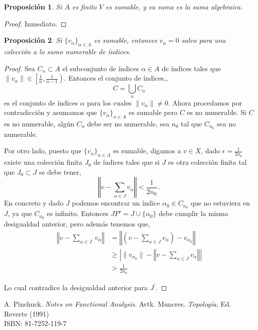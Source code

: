 \documentclass[12pt]{book}
\newtheorem{prop}{\bf Proposición}[chapter]
\newcommand{\norm}[1]{\lVert #1\rVert }
\newcommand{\Abs}[1]{\left\vert #1\right\vert}
\newcommand{\Norm}[1]{\left\Vert #1\right\Vert }
\begin{document}
 \begin{prop} Si $A$ es finito $V$ es sumable,  y su suma es la suma algebraica.
\end{prop}
\begin{proof}
 Inmediato.
\end{proof}
\begin{prop} 
Si $\{v_\alpha\}_{\alpha\in A}$  es sumable,  entonces  $v_\alpha=0$ salvo para una colección a lo sumo numerable de índices.
\end{prop}
\begin{proof}
Sea $C_n\subset A$ el subconjunto de índices  $\alpha\in A$  de índices tales que $\norm{v_\alpha}\in\left[\frac{1}{n},\frac{1}{n-1}\right)$. Entonces el conjunto de índices,,
$$C=\bigcup_{n}C_n$$
es el conjunto de índices $\alpha$ para los cuales $\norm{v_\alpha}\not=0$. Ahora procedamos por contradicción y asumamos que $\{v_\alpha\}_{\alpha\in A}$ es sumable pero $C$ es no numerable. Si $C$ es no numerable, algún $C_n$ debe ser no numerable, sea $n_0$ tal que $C_{n_0}$ sea no numerable.

Por otro lado, puesto que $\{v_\alpha\}_{\alpha\in A}$ es sumable, digamos a $v\in X$, dado $\epsilon=\frac{1}{2n_0}$ existe una colección finita  $J_0$ de índices tales que si $J$ es otra colección finita tal que  $J_0\subset J$ se debe tener,
$$\Norm{ v-\sum_{\alpha\in J} v_\alpha}<\frac{1}{2n_0}\,.$$
En concreto y dado $J$ podemos encontrar un índice   $\alpha_0\in C_{n_0}$ que no estuviera en $J$, ya que $C_{n_0}$  es infinito. Entonces $JP\prime =J\cup\{\alpha_0\}$ debe cumplir la misma desigualdad anterior, pero además tenemos que,
\begin{align*}
\Norm{ v-\sum_{\alpha\in J^\prime} v_\alpha} &=\Norm{\left(v -\sum_{\alpha\in J}  v_\alpha\right)  -v_{\alpha_0} } \\
&\geq \Abs{\norm{v_{\alpha_0} }-\Norm{v -\sum_{\alpha\in J}  v_\alpha}}\\
&> \frac{1}{2n_0}
\end{align*}
       
       Lo  cual contradice la desigualdad anterior para $J^\prime$.
\end{proof}  



\backmatter

\begin{thebibliography}{99}
A. Pinchuck. {\it Notes on Functional Analysis}. 
Avtk. Muncres. \emph{ Topolog\'{i}a}, Ed. Reverte  (1991) \\
ISBN: 81-7252-119-7
\end{thebibliography}
\end{document}
